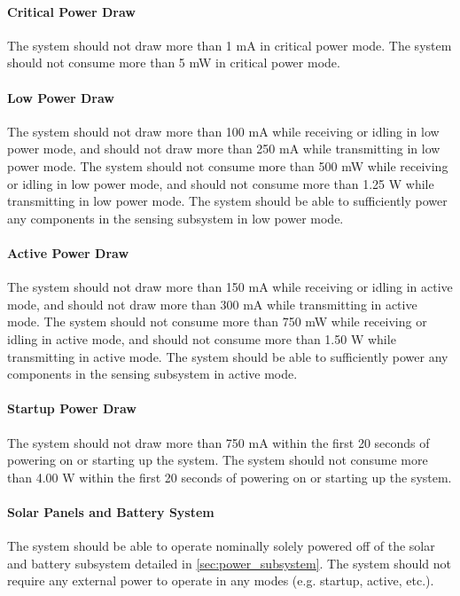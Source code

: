 \paragraph{Critical Power Draw} The system should not draw more than 1 mA in
critical power mode. The system should not consume more than 5 mW in critical
power mode.

\paragraph{Low Power Draw} The system should not draw more than 100 mA while
receiving or idling in low power mode, and should not draw more than 250
mA while transmitting in low power mode. The system should not consume more
than 500 mW while receiving or idling in low power mode, and should not
consume more than 1.25 W while transmitting in low power mode. The system
should be able to sufficiently power any components in the sensing subsystem in
low power mode.

\paragraph{Active Power Draw} The system should not draw more than 150 mA while
receiving or idling in active mode, and should not draw more than 300
mA while transmitting in active mode. The system should not consume more
than 750 mW while receiving or idling in active mode, and should not
consume more than 1.50 W while transmitting in active mode. The system
should be able to sufficiently power any components in the sensing subsystem in
active mode.

\paragraph{Startup Power Draw} The system should not draw more than 750 mA
within the first 20 seconds of powering on or starting up the system. The
system should not consume more than 4.00 W within the first 20 seconds of
powering on or starting up the system.

\paragraph{Solar Panels and Battery System} The system should be able to
operate nominally solely powered off of the solar and battery subsystem
detailed in \autoref{sec:power_subsystem}. The system should not require any
external power to operate in any modes (e.g. startup, active, etc.).

